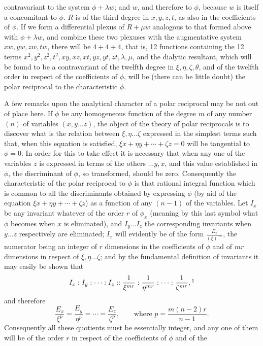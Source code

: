 \documentclass[11pt]{article}
\newcommand{\sourcepage}[1]{\marginpar{\scriptsize p.~#1}}
\begin{document}
{{\sourcepage{303}
contravariant to the system $\phi+\lambda w$; and $w$, and therefore to $\phi$, because $w$ is itself a concomitant to $\phi$. $R$ is of the third degree in $x,y,z,t$, as also in the coefficients of $\phi$. If we form a differential plexus of $R+\mu w$ analogous to that formed above with $\phi+\lambda w$, and combine these two plexuses with the augmentative system $xw,yw,zw,tw$, there will be $4+4+4$, that is, 12 functions containing the 12 terms $x^2,y^2,z^2,t^2,xy,xz,xt,yz,yt,zt,\lambda,\mu$, and the dialytic resultant, which will be found to be a contravariant of the twelfth degree in $\xi,\eta,\zeta,\theta$, and of the twelfth order in respect of the coefficients of $\phi$, will be (there can be little doubt) the polar reciprocal to the characteristic $\phi$.

A few remarks upon the analytical character of a polar reciprocal may be not out of place here. If $\phi$ be any homogeneous function of the degree $m$ of any number $(n)$ of variables $(x,y\ldots z)$, the object of the theory of polar reciprocals is to discover what is the relation between $\xi,\eta\ldots\zeta$ expressed in the simplest terms such that, when this equation is satisfied, $\xi x+\eta y+\cdots+\zeta z=0$ will be tangential to $\phi=0$. In order for this to take effect it is necessary that when any one of the variables $z$ is expressed in terms of the others $\ldots y,x$, and this value established in $\phi$, the discriminant of $\phi$, so transformed, should be zero. Consequently the characteristic of the polar reciprocal to $\phi$ is that rational integral function which is common to all the discriminants obtained by expressing $\phi$ (by aid of the equation $\xi x+\eta y+\cdots+\zeta z$) as a function of any $(n-1)$ of the variables. Let $I_x$ be any invariant whatever of the order $r$ of $\phi_x$ (meaning by this last symbol what $\phi$ becomes when $x$ is eliminated), and $I_y\ldots I_z$ the corresponding invariants when $y\ldots z$ respectively are eliminated; $I_x$ will evidently be of the form $\frac{E_x}{(\xi)^{mr}}$, the numerator being an integer of $r$ dimensions in the coefficients of $\phi$ and of $mr$ dimensions in respect of $\xi,\eta\ldots\zeta$; and by the fundamental definition of invariants it may easily be shown that
\[
I_x:I_y:\cdots:I_z::\frac1{\xi^{mr}}:\frac1{\eta^{mr}}:\cdots:\frac1{\zeta^{mr}},\footnotemark
\]
and therefore
\[
\frac{E_x}{\xi^p}=\frac{E_y}{\eta^p}=\cdots=\frac{E_z}{\zeta^p},
\qquad
\text{where }p=\frac{m(n-2)r}{n-1}.
\]
Consequently all these quotients must be essentially integer, and any one of them will be of the order $r$ in respect of the coefficients of $\phi$ and of the

}}
\end{document}
